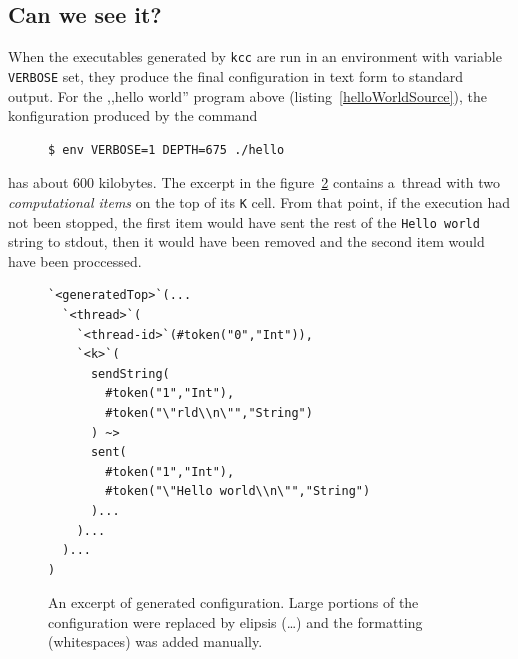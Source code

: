 \documentclass{fithesis3}
\newcommand{\kcc}{\texttt{kcc}\xspace}
\begin{document}
\subsection{Can we see it?}

When the executables generated by \kcc are run in an environment with variable \texttt{VERBOSE} set, they produce the final configuration in text form to standard output. For the ,,hello world'' program above (listing~\ref{helloWorldSource}), the konfiguration produced by
the command
\begin{figure}[ht]
\begin{lstlisting}[language=bash]
$ env VERBOSE=1 DEPTH=675 ./hello
\end{lstlisting}
\label{exampleConfigurationCommand}
\end{figure}

has about 600 kilobytes. The excerpt in the figure~\ref{exampleConfigurationOutput} contains a~thread with two \textit{computational items} on the top of its \texttt{K} cell. From that point, if the execution had not been stopped, the first item would have sent the rest of the \texttt{Hello world} string to stdout, then it would have been removed and the second item would have been proccessed.

\begin{figure}[ht]
\begin{lstlisting}
`<generatedTop>`(...
  `<thread>`(
    `<thread-id>`(#token("0","Int")),
    `<k>`(
      sendString(
        #token("1","Int"),
        #token("\"rld\\n\"","String")
      ) ~>
      sent(
        #token("1","Int"),
        #token("\"Hello world\\n\"","String")
      )...
    )...
  )...
)
\end{lstlisting}
\caption{An excerpt of 
generated configuration.
Large portions of the configuration were replaced by elipsis (\ldots) and the formatting (whitespaces) was added manually.}
\label{exampleConfigurationOutput}
\end{figure}



\end{document}
